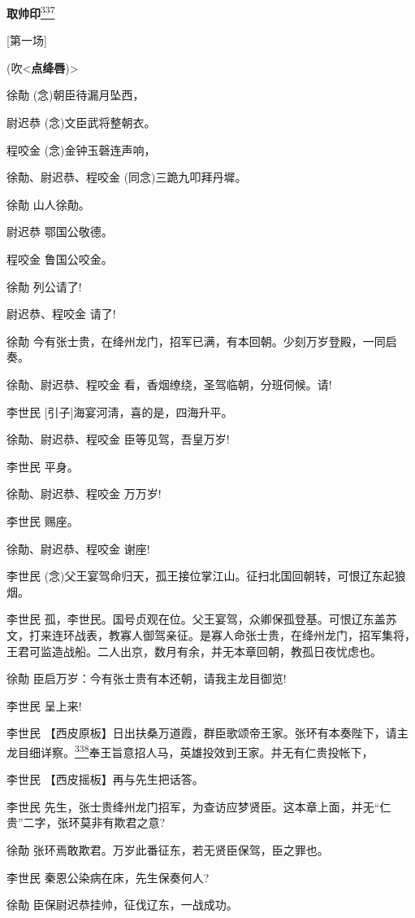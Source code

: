 \textbf{取帅印}\protect\hyperlink{fn337}{\textsuperscript{337}}

{[}第一场{]}

(吹\textless{}\textbf{点绛唇})\textgreater{}

徐勣 (念)朝臣待漏月坠西，

尉迟恭 (念)文臣武将整朝衣。

程咬金 (念)金钟玉磬连声响，

徐勣、尉迟恭、程咬金 (同念)三跪九叩拜丹墀。

徐勣 山人徐勣。

尉迟恭 鄂国公敬德。

程咬金 鲁国公咬金。

徐勣 列公请了!

尉迟恭、程咬金 请了!

徐勣
今有张士贵，在绛州龙门，招军已满，有本回朝。少刻万岁登殿，一同启奏。

徐勣、尉迟恭、程咬金 看，香烟缭绕，圣驾临朝，分班伺候。请!

李世民 {[}引子{]}海宴河淸，喜的是，四海升平。

徐勣、尉迟恭、程咬金 臣等见驾，吾皇万岁!

李世民 平身。

徐勣、尉迟恭、程咬金 万万岁!

李世民 赐座。

徐勣、尉迟恭、程咬金 谢座!

李世民
(念)父王宴驾命归天，孤王接位掌江山。征扫北国回朝转，可恨辽东起狼烟。

李世民
孤，李世民。国号贞观在位。父王宴驾，众卿保孤登基。可恨辽东盖苏文，打来连环战表，教寡人御驾亲征。是寡人命张士贵，在绛州龙门，招军集将，王君可监造战船。二人出京，数月有余，并无本章回朝，教孤日夜忧虑也。

徐勣 臣启万岁：今有张士贵有本还朝，请我主龙目御览!

李世民 呈上来!

李世民
【西皮原板】日出扶桑万道霞，群臣歌颂帝王家。张环有本奏陛下，请主龙目细详察。\protect\hyperlink{fn338}{\textsuperscript{338}}奉王旨意招人马，英雄投效到王家。并无有仁贵投帐下，

李世民 【西皮摇板】再与先生把话答。

李世民
先生，张士贵绛州龙门招军，为查访应梦贤臣。这本章上面，并无``仁贵''二字，张环莫非有欺君之意?

徐勣 张环焉敢欺君。万岁此番征东，若无贤臣保驾，臣之罪也。

李世民 秦恩公染病在床，先生保奏何人?

徐勣 臣保尉迟恭挂帅，征伐辽东，一战成功。

